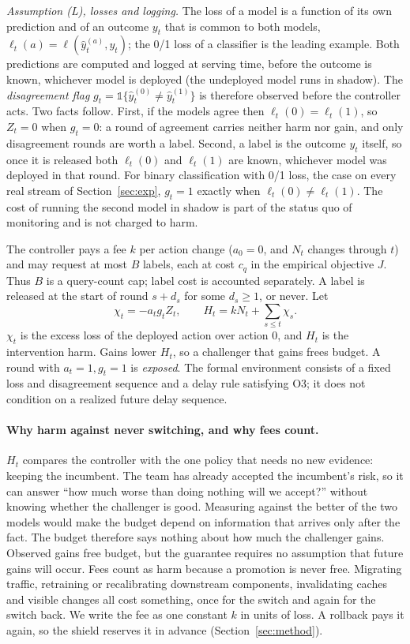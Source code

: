 \documentclass[10pt]{article}
\theoremstyle{plain}
\theoremstyle{definition}
\newcommand{\one}{\mathds{1}}
\begin{document}
\emph{Assumption (L), losses and logging.} The loss of a model is a function of its own prediction and of an outcome $y_t$ that is common to both models, $\ell_t(a)=\ell(\hat y^{(a)}_t,y_t)$; the 0/1 loss of a classifier is the leading example. Both predictions are computed and logged at serving time, before the outcome is known, whichever model is deployed (the undeployed model runs in shadow). The \emph{disagreement flag} $g_t=\one\{\hat y^{(0)}_t\ne\hat y^{(1)}_t\}$ is therefore observed before the controller acts. Two facts follow. First, if the models agree then $\ell_t(0)=\ell_t(1)$, so $Z_t=0$ when $g_t=0$: a round of agreement carries neither harm nor gain, and only disagreement rounds are worth a label. Second, a label is the outcome $y_t$ itself, so once it is released both $\ell_t(0)$ and $\ell_t(1)$ are known, whichever model was deployed in that round. For binary classification with 0/1 loss, the case on every real stream of Section~\ref{sec:exp}, $g_t=1$ exactly when $\ell_t(0)\ne\ell_t(1)$. The cost of running the second model in shadow is part of the status quo of monitoring and is not charged to harm.

The controller pays a fee $k$ per action change ($a_0=0$, and $N_t$ changes through $t$) and may request at most $B$ labels, each at cost $c_q$ in the empirical objective $J$. Thus $B$ is a query-count cap; label cost is accounted separately. A label is released at the start of round $s+d_s$ for some $d_s\ge1$, or never. Let
\begin{equation*}
\chi_t=-a_tg_tZ_t,\qquad H_t=kN_t+\sum_{s\le t}\chi_s .
\end{equation*}
$\chi_t$ is the excess loss of the deployed action over action $0$, and $H_t$ is the intervention harm. Gains lower $H_t$, so a challenger that gains frees budget. A round with $a_t=1,g_t=1$ is \emph{exposed}. The formal environment consists of a fixed loss and disagreement sequence and a delay rule satisfying O3; it does not condition on a realized future delay sequence.

\paragraph{Why harm against never switching, and why fees count.}
$H_t$ compares the controller with the one policy that needs no new evidence: keeping the incumbent. The team has already accepted the incumbent's risk, so it can answer ``how much worse than doing nothing will we accept?'' without knowing whether the challenger is good. Measuring against the better of the two models would make the budget depend on information that arrives only after the fact. The budget therefore says nothing about how much the challenger gains. Observed gains free budget, but the guarantee requires no assumption that future gains will occur. Fees count as harm because a promotion is never free. Migrating traffic, retraining or recalibrating downstream components, invalidating caches and visible changes all cost something, once for the switch and again for the switch back. We write the fee as one constant $k$ in units of loss. A rollback pays it again, so the shield reserves it in advance (Section~\ref{sec:method}).
\end{document}

